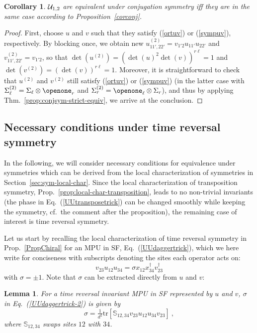 \documentclass[pra,twocolumn,nofootinbib,superscriptaddress]{revtex4-1}
\newtheorem{cor}[thm]{Corollary}
\newtheorem{lem}[thm]{Lemma}
\begin{document}
\begin{cor}
	\label{cor:equiv-under-conjugation}
	${\cal U}_{1,2}$ are equivalent under conjugation symmetry iff they are in
	the same case according to Proposition~\ref{corconj}.
\end{cor}


\begin{proof}
	First, choose $u$ and $v$ such that they satisfy (\ref{ortuv}) or
	(\ref{sympuv}), respectively.  By blocking once, we obtain new
	$u^{(2)}_{11',22'}= v_{1'2}u_{11'}u_{22'}$ and
	$v^{(2)}_{11',22'}=v_{1'2}$, so that
	$\det(u^{(2)})=(\det(u)^2\det(v))^{r\ell}=1$ and
	$\det(v^{(2)})=(\det(v))^{r\ell}=1$.  Moreover, it is straightforward to
	check that $u^{(2)}$ and $v^{(2)}$ still satisfy (\ref{ortuv}) or
	(\ref{sympuv}) (in the latter case with
	$\Sigma_{\ell}^{(2)}=\Sigma_\ell\otimes\openone_r$ and
	$\Sigma_{r}^{(2)}=\openone_\ell\otimes \Sigma_r$), and thus by applying
	Thm.~\ref{prop:conjsym-strict-equiv}, we arrive at the conclusion.
\end{proof}



\subsection{\label{sec:necessary-cond-time-rev}
	Necessary conditions under time reversal symmetry}

In the following, we will consider necessary conditions for
equivalence under symmetries which can be derived from the local
characterization of symmetries in Section~\ref{sec:sym-local-char}. Since the local
characterization of transposition symmetry,
Prop.~\ref{prop:local-char-transposition}, leads to no non-trivial
invariants (the phase in Eq.~(\ref{UUtransposetrick}) can be changed
smoothly while keeping the symmetry, cf.~the comment after the
proposition), the remaining case of interest is time reversal symmetry.

Let us start by recalling the local characterization of time reversal
symmetry in Prop.~\ref{PropChiral} for an MPU in SF,
Eq.~(\ref{UUdaggertrick}), which we here write for conciseness with
subscripts denoting the sites each operator acts on:
\begin{equation}
	v_{23}u_{12}u_{34}=
	\sigma x_{12} x_{34}^\dagger  v_{23}^\dagger
	\label{UUdaggertrick-2}
\end{equation}
with $\sigma=\pm1$.   Note that $\sigma$ can be extracted directly from
$u$ and $v$:
\begin{lem}
	For a time reversal invariant MPU in SF represented by $u$ and $v$,
	$\sigma$ in Eq.~(\ref{UUdaggertrick-2}) is given by
	\begin{equation}
		\label{eq:sigma-from-trace}
		\sigma = \tfrac{1}{d^2}\mathrm{tr}[\mathbb S_{12,34}v_{23}u_{12}u_{34}v_{23}]\ ,
	\end{equation}
	where $\mathbb S_{12,34}$ swaps sites $12$ with $34$.
\end{lem}
\end{document}
